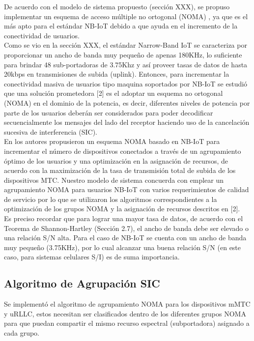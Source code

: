 De acuerdo con el modelo de sistema propuesto (sección XXX), se propuso implementar un esquema de acceso múltiple no ortogonal (NOMA) \parencite{DIng2017}, ya que es el más apto para el estándar NB-IoT debido a que ayuda en el incremento de la conectividad de usuarios.\\

Como se vio en la sección XXX, el estándar Narrow-Band IoT se caracteriza por proporcionar un ancho de banda muy pequeño de apenas 180KHz, lo suficiente para brindar 48 sub-portadoras de 3.75Khz y así proveer tasas de datos de hasta 20kbps en transmisiones de subida (uplink). Entonces, para incrementar la conectividad masiva de usuarios tipo maquina soportados por NB-IoT se estudió que una solución prometedora [2] es el adoptar un esquema no ortogonal (NOMA) en el dominio de la potencia, es decir, diferentes niveles de potencia por parte de los usuarios deberán ser considerados para poder decodificar secuencialmente los mensajes del lado del receptor haciendo uso de la cancelación sucesiva de interferencia (SIC).\\

En \parencite{Shahini2019} los autores propusieron un esquema NOMA basado en NB-IoT para incrementar el número de dispositivos conectados a través de un agrupamiento óptimo de los usuarios y una optimización en la asignación de recursos, de acuerdo con la maximización de la tasa de transmisión total de subida de los dispositivos MTC. Nuestro modelo de sistema concuerda con emplear un agrupamiento NOMA para usuarios NB-IoT con varios requerimientos de calidad de servicio por lo que se utilizaron los algoritmos correspondientes a la optimización de los grupos NOMA y la asignación de recursos descritos en [2].\\

Es preciso recordar que para lograr una mayor tasa de datos, de acuerdo con el Teorema de Shannon-Hartley (Sección 2.7), el ancho de banda debe ser elevado o una relación S/N alta. Para el caso de NB-IoT se cuenta con un ancho de banda muy pequeño (3.75KHz), por lo cual alcanzar una buena relación S/N (en este caso, para sistemas celulares S/I) es de suma importancia.\\

\subsection{Algoritmo de Agrupación SIC}
Se implementó el algoritmo de agrupamiento NOMA para los dispositivos mMTC y uRLLC, estos necesitan ser clasificados dentro de los diferentes grupos NOMA para que puedan compartir el mismo recurso espectral (subportadora) asignado a cada grupo.\\

